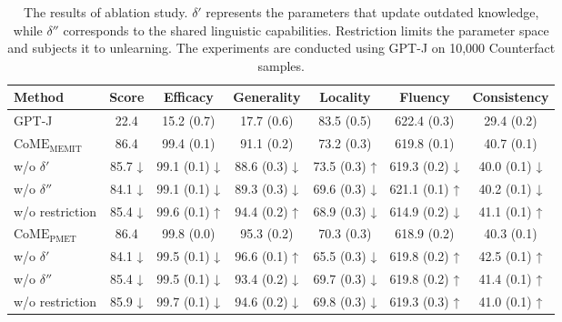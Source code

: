 \begin{table*}[hbt!]
\centering
\renewcommand{\arraystretch}{1.4}
{\footnotesize
\begin{tabular}{lcccccc}
\toprule
\textbf{Method}                        & \textbf{Score} & \textbf{Efficacy} & \textbf{Generality} & \textbf{Locality} & \textbf{Fluency} & \textbf{Consistency} \\ \midrule
GPT-J          & 22.4           & 15.2 (0.7)        & 17.7 (0.6)          & 83.5 (0.5)           & 622.4 (0.3)      & 29.4 (0.2)           \\ \hline
\textbf{$\text{CoME}_{\text{MEMIT}}$}              & 86.4           & 99.4 (0.1)        & 91.1 (0.2)          & 73.2 (0.3)           & 619.8 (0.1)      & 40.7 (0.1)           \\ \midrule
w/o $\delta'$   & 85.7 ↓         & 99.1 (0.1) ↓      & 88.6 (0.3) ↓        & 73.5 (0.3) ↑         & 619.3 (0.2) ↓    & 40.0 (0.1) ↓         \\
w/o $\delta''$ & 84.1 ↓         & 99.1 (0.1) ↓      & 89.3 (0.3) ↓        & 69.6 (0.3) ↓         & 621.1 (0.1) ↑    & 40.2 (0.1) ↓         \\ 
w/o restriction        & 85.4 ↓         & 99.6 (0.1) ↑      & 94.4 (0.2) ↑        & 68.9 (0.3) ↓         & 614.9 (0.2) ↓    & 41.1 (0.1) ↑         \\ \midrule
\textbf{$\text{CoME}_{\text{PMET}}$}               & 86.4           & 99.8 (0.0)        & 95.3 (0.2)          & 70.3 (0.3)           & 618.9 (0.2)      & 40.3 (0.1)           \\ \hline
w/o $\delta'$    & 84.1 ↓         & 99.5 (0.1) ↓      & 96.6 (0.1) ↑        & 65.5 (0.3) ↓         & 619.8 (0.2) ↑    & 42.5 (0.1) ↑         \\
w/o $\delta''$ & 85.4 ↓         & 99.5 (0.1) ↓      & 93.4 (0.2) ↓        & 69.7 (0.3) ↓         & 619.8 (0.2) ↑    & 41.4 (0.1) ↑         \\ 
w/o restriction        & 85.9 ↓         & 99.7 (0.1) ↓      & 94.6 (0.2) ↓        & 69.8 (0.3) ↓         & 619.3 (0.3) ↑    & 41.0 (0.1) ↑        
 \\ \bottomrule
\end{tabular}
}
\caption{The results of ablation study. $\delta'$ represents the parameters that update outdated knowledge, while $\delta''$ corresponds to the shared linguistic capabilities. Restriction limits the parameter space and subjects it to unlearning. The experiments are conducted using GPT-J on 10,000 Counterfact samples. }
\label{tab:ablation}
\end{table*}
